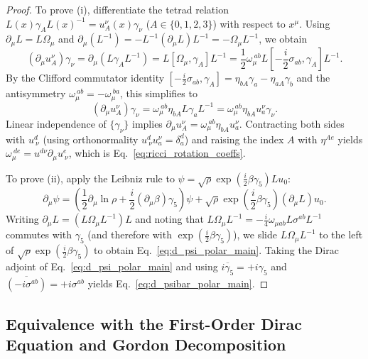 \documentclass[11pt, a4paper]{article}
\theoremstyle{definition}
\begin{document}
\begin{proof}
To prove (i), differentiate the tetrad relation $L(x)\gamma_A L(x)^{-1} = u_A^\nu(x)\gamma_\nu$ ($A \in \{0,1,2,3\}$) with respect to $x^\mu$. Using $\partial_\mu L = L \Omega_\mu$ and $\partial_\mu(L^{-1}) = -L^{-1}(\partial_\mu L)L^{-1} = -\Omega_\mu L^{-1}$, we obtain
\begin{equation}
(\partial_\mu u_A^\nu)\gamma_\nu = \partial_\mu \left(L \gamma_A L^{-1}\right) = L \left[ \Omega_\mu, \gamma_A \right] L^{-1} = \frac{1}{2}\omega_\mu^{\ ab} L \left[ -\frac{i}{2}\sigma_{ab}, \gamma_A \right] L^{-1}.
\end{equation}
By the Clifford commutator identity $[-\frac{i}{2}\sigma_{ab}, \gamma_A] = \eta_{bA}\gamma_a - \eta_{aA}\gamma_b$ and the antisymmetry $\omega_\mu^{\ ab} = -\omega_\mu^{\ ba}$, this simplifies to
\begin{equation}
(\partial_\mu u_A^\nu)\gamma_\nu = \omega_\mu^{\ ab}\eta_{bA} L \gamma_a L^{-1} = \omega_\mu^{\ ab}\eta_{bA} u_a^\nu \gamma_\nu.
\end{equation}
Linear independence of $\{\gamma_\nu\}$ implies $\partial_\mu u_A^\nu = \omega_\mu^{\ ab}\eta_{bA} u_a^\nu$. Contracting both sides with $u^d_{\ \nu}$ (using orthonormality $u^d_{\ \nu} u_a^\nu = \delta^d_a$) and raising the index $A$ with $\eta^{Ae}$ yields $\omega_\mu^{\ de} = u^{d\nu}\partial_\mu u^e_{\ \nu}$, which is Eq.~\eqref{eq:ricci_rotation_coeffs}.

To prove (ii), apply the Leibniz rule to $\psi = \sqrt{\rho}\exp(\frac{i}{2}\beta\gamma_5) L u_0$:
\begin{equation}
\partial_\mu \psi = \left( \frac{1}{2}\partial_\mu \ln\rho + \frac{i}{2}(\partial_\mu \beta)\gamma_5 \right)\psi + \sqrt{\rho}\exp\left(\frac{i}{2}\beta\gamma_5\right)(\partial_\mu L) u_0.
\end{equation}
Writing $\partial_\mu L = (L \Omega_\mu L^{-1}) L$ and noting that $L \Omega_\mu L^{-1} = -\frac{i}{4}\omega_{\mu ab} L\sigma^{ab}L^{-1}$ commutes with $\gamma_5$ (and therefore with $\exp(\frac{i}{2}\beta\gamma_5)$), we slide $L\Omega_\mu L^{-1}$ to the left of $\sqrt{\rho}\exp(\frac{i}{2}\beta\gamma_5)$ to obtain Eq.~\eqref{eq:d_psi_polar_main}. Taking the Dirac adjoint of Eq.~\eqref{eq:d_psi_polar_main} and using $\overline{i\gamma_5} = +i\gamma_5$ and $\overline{(-i\sigma^{ab})} = +i\sigma^{ab}$ yields Eq.~\eqref{eq:d_psibar_polar_main}.
\end{proof}

\subsection{Equivalence with the First-Order Dirac Equation and Gordon Decomposition}
\end{document}
